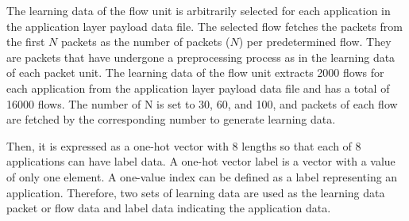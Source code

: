 The learning data of the flow unit is arbitrarily selected for each application in the application layer payload data file.
The selected flow fetches the packets from the first $N$ packets as the number of packets ($N$) per predetermined flow.
They are packets that have undergone a preprocessing process as in the learning data of each packet unit.
The learning data of the flow unit extracts 2000 flows for each application from the application layer payload data file and has a total of 16000 flows.
The number of N is set to 30, 60, and 100, and packets of each flow are fetched by the corresponding number to generate learning data.

Then, it is expressed as a one-hot vector with 8 lengths so that each of 8 applications can have label data.
A one-hot vector label is a vector with a value of only one element.
A one-value index can be defined as a label representing an application.
Therefore, two sets of learning data are used as the learning data packet or flow data and label data indicating the application data.